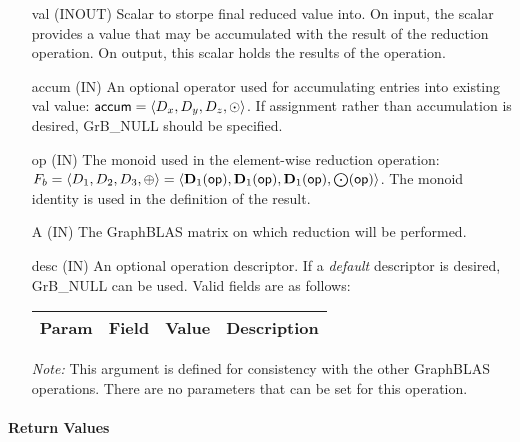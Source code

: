 \begin{itemize}[leftmargin=1.1in]
    \item[{\sf val}]    ({\sf INOUT}) Scalar to storpe final reduced value into. On input,
    the scalar provides a value that may be accumulated with the result of the
    reduction operation.  On output, this scalar holds the results of the
    operation.

    \item[{\sf accum}]    ({\sf IN}) An optional operator used for accumulating
    entries into existing {\sf val} value: ${\sf accum} = \langle D_x,
    D_y, D_z,\odot \rangle$. If assignment rather than accumulation is
    desired, {\sf GrB\_NULL} should be specified.

    \item[{\sf op}]    ({\sf IN}) The monoid 
    used in the element-wise reduction operation:
    $F_b=\langle D_1,D_2,D_3,\oplus \rangle = \langle \bold{D}_1({\sf op}), \bold{D}_1({\sf op}),
    \bold{D}_1({\sf op}),\bold{\bigodot}({\sf op})\rangle$.
    The monoid identity is used in the definition of the result.
    
    \item[{\sf A}]     ({\sf IN}) The GraphBLAS matrix on which
	    reduction will be performed.
    
    \item[{\sf desc}]  ({\sf IN}) An optional operation descriptor.  If a \emph{default}
    descriptor is desired, {\sf GrB\_NULL} can be used.
    Valid fields are
    as follows: \\
    
    \begin{tabular}{lllp{2.5in}}
        Param & Field  & Value & Description \\
        \hline
    \end{tabular}

    \emph{Note:} This argument is defined for consistency with the other GraphBLAS operations.
    There are no parameters that can be set for this operation.
\end{itemize}

\paragraph{Return Values}

